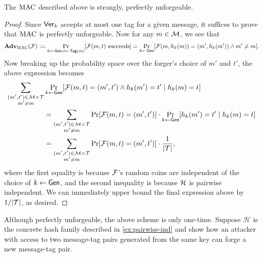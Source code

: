 \documentclass[11pt]{article}
\begin{document}
\begin{theorem}
  \label{thm:pwise-unforgeable}
  The $\text{MAC}$ described above is strongly, perfectly unforgeable.
\end{theorem}

\begin{proof}
  Since $\mathsf{Ver}_{k}$ accepts at most one tag for a given message, it
  suffices to prove that $\text{MAC}$ is perfectly unforgeable.  Now for any
  $m \in \mathcal{M}$, we see that
  \[
  \mathbf{Adv}_{\text{MAC}}(\mathcal{F}) := \Pr_{k \gets \mathsf{Gen}, t \gets
    \mathsf{Tag}(m)}[\mathcal{F}(m, t) \text{ succeeds}] = \Pr_{k \gets
    \mathsf{Gen}}[\mathcal{F}(m, h_k(m)) = (m', h_k(m')) \wedge m' \neq m].
  \]
  Now breaking up the probability space over the forger's choice of
  $m'$ and $t'$, the above expression becomes
  \begin{align*}
    \sum_{\substack{(m',t') \in \mathcal{M} \times \mathcal{T} \\ m' \neq
        m}} &\Pr_{k \gets \mathsf{Gen}}[\mathcal{F}(m, t) = (m',t') \wedge
    h_{k}(m')=t' \mid h_{k}(m) = t] \\
    & = \sum_{\substack{(m',t') \in \mathcal{M} \times \mathcal{T} \\
        m' \neq m}} \Pr[\mathcal{F}(m, t) = (m',t')] \cdot \Pr_{k \gets
      \mathsf{Gen}}[h_k(m') = t' \mid h_{k}(m) = t] \\
    & = \sum_{\substack{(m',t') \in \mathcal{M} \times \mathcal{T} \\
        m' \neq m}} \Pr[\mathcal{F}(m, t) = (m',t')] \cdot
    \frac{1}{|\mathcal{T}|},
  \end{align*}
  where the first equality is because $\mathcal{F}$'s random coins are
  independent of the choice of $k \gets \mathsf{Gen}$, and the second
  inequality is because $\mathcal{H}$ is pairwise independent.  We can
  immediately upper bound the final expression above by
  $1/\lvert\mathcal{T}\rvert$, as desired.
\end{proof}

\begin{question}[ID=one-time]
  Although perfectly unforgeable, the above scheme is only
  one-time. Suppose \(\mathcal{H}\) is the concrete hash family
  described in \cref{ex:pairwise-ind} and show how an attacker
  with access to two message-tag pairs generated from the same key can
  forge a new message-tag pair.
\end{question}
\end{document}
